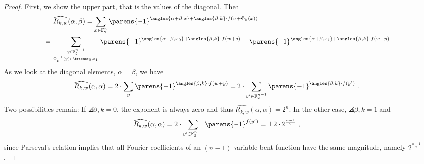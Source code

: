 \begin{proof}
    First, we show the upper part, that is the values of the diagonal.
    Then
    \begin{align*}
        &\hphantom{=}\ \ \widehat{R_{k,w}}(\alpha, \beta)
         = \sum_{x \in \F_2^{n}} \parens{-1}^{\angles{\alpha + \beta, x} + \angles{\beta, k}\cdot f(w + \Phi_k(x))} \\
        &= \sum_{\tower{y \in \F_2^{n-1}}{\Phi_k^{-1}(y) \in \set{x_0, x_1}}} \parens{-1}^{\angles{\alpha + \beta, x_0} + \angles{\beta, k}\cdot f(w + y)} + \parens{-1}^{\angles{\alpha + \beta, x_1} + \angles{\beta, k}\cdot f(w + y)}
    \end{align*}
    As we look at the diagonal elements, $\alpha = \beta$, we have
    \begin{align*}
    \widehat{R_{k,w}}(\alpha, \alpha)
    = 2 \cdot \sum_{y} \parens{-1}^{\angles{\beta, k} \cdot f(w + y)}
    = 2 \cdot \sum_{y^\prime \in \F_2^{n-1}} \parens{-1}^{\angles{\beta, k} \cdot f(y^\prime)}\;.
    \end{align*}
    Two possibilities remain:
    If $\angles{\beta, k} = 0$, the exponent is always zero and thus $\widehat{R_{k,w}}(\alpha, \alpha) = 2^n$.
    In the other case, $\angles{\beta, k} = 1$ and
    \begin{equation}\label{eqn:bison:lat_proof_adjust1}
        \widehat{R_{k,w}}(\alpha, \alpha) = 2 \cdot \sum_{y^\prime \in \F_2^{n-1}} \parens{-1}^{f(y^\prime)} = \pm 2 \cdot 2^{\frac{n-1}{2}}\;,
    \end{equation}
    since Parseval's relation implies that all Fourier coefficients of an $(n-1)$-variable bent function have the same magnitude, namely $2^{\frac{n-1}{2}}$.


\end{proof}
